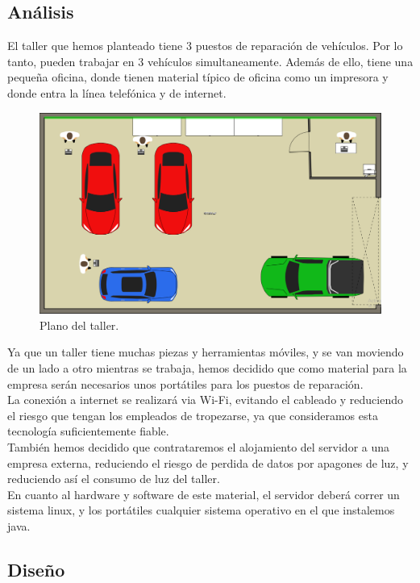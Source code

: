 \documentclass{article}
\begin{document}
\subsection{Análisis}
El taller que hemos planteado tiene 3 puestos de reparación de vehículos. Por lo tanto, pueden trabajar en 3 vehículos simultaneamente.
Además de ello, tiene una pequeña oficina, donde tienen material típico de oficina como un impresora y donde entra la línea telefónica y de internet.
\begin{figure}[H]
  \centering
  \includegraphics[width=1.0\textwidth]{misc/planoTaller.PNG}
  \caption{Plano del taller.}
  \label{fig:planoTaller}
\end{figure}
Ya que un taller tiene muchas piezas y herramientas móviles, y se van moviendo de un lado a otro mientras se trabaja, 
hemos decidido que como material para la empresa serán necesarios unos portátiles para los puestos de reparación.\\
La conexión a internet se realizará via Wi-Fi, evitando el cableado y reduciendo el riesgo que tengan los empleados de 
tropezarse, ya que consideramos esta tecnología suficientemente fiable.\\ 
También hemos decidido que contrataremos el alojamiento del servidor a una empresa externa, reduciendo el riesgo de perdida de datos por apagones de 
luz, y reduciendo así el consumo de luz del taller. \\ En cuanto al hardware y software de este material, el servidor deberá correr un sistema linux, 
y los portátiles cualquier sistema operativo en el que instalemos java.
\subsection{Diseño} 
\end{document}
